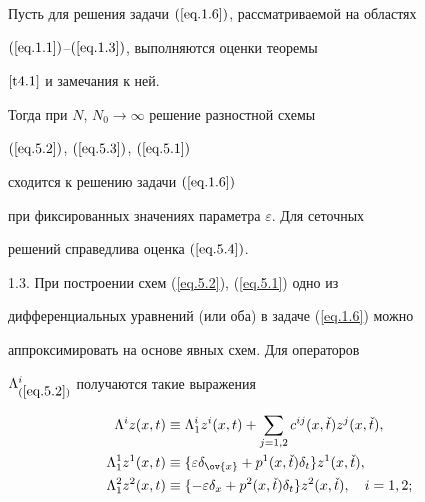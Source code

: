 \begin{thms} \label{t5.1}


Пусть для решения задачи $(\ref{eq.1.6})$, рассматриваемой на областях


$(\ref{eq.1.1})$--$(\ref{eq.1.3})$, выполняются оценки теоремы


$\ref{t4.1}$ и замечания к ней.


Тогда при $N$, $N_0\to \infty$ решение разностной схемы


$(\ref{eq.5.2})$, $(\ref{eq.5.3})$, $(\ref{eq.5.1})$


сходится к решению задачи $(\ref{eq.1.6})$


при фиксированных значениях параметра $\varepsilon$. Для сеточных


решений справедлива оценка $(\ref{eq.5.4})$. \vspace{-1mm}


\end{thms}





1.3. При построении схем (\ref{eq.5.2}), (\ref{eq.5.1}) одно из


дифференциальных уравнений (или оба) в задаче (\ref{eq.1.6}) можно


аппроксимировать на основе явных схем. Для операторов


$\Lambda^i_{(\ref{eq.5.2})}$ получаются такие выражения


\begin{align}


\Lambda^i z(x, t)&\equiv \Lambda^i_1 z^i(x, t)+\sum_{j=1, 2} c^{ij}(x,


\check{t}) z^j(x, \check{t}),\notag\\


%


\label{eq.5.6}


\Lambda^1_1 z^1(x, t)&\equiv \{\varepsilon \delta_{\ov{x}}+p^1(x, \check{t})


\delta_t\} z^1(x, \check{t}), \\


\Lambda^2_1 z^2(x, t)&\equiv \{-\varepsilon \delta_x+p^2(x, \check{t})


\delta_t\} z^2(x, \check{t}), \quad i=1, 2;\notag


\end{align}


